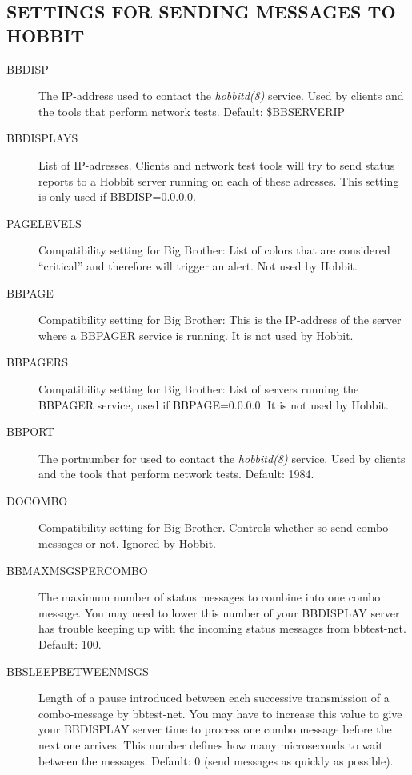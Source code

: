\subsection{SETTINGS FOR SENDING MESSAGES TO HOBBIT}
\begin{description}
\item[BBDISP] The IP-address used to contact the \emph{hobbitd(8)}
 service. Used by clients and the tools that perform network tests. Default: \$BBSERVERIP 

 

\item[BBDISPLAYS] List of IP-adresses. Clients and network test tools will try to send status reports to a Hobbit server running on each of these adresses. This setting is only used if BBDISP=0.0.0.0. 

 

\item[PAGELEVELS] Compatibility setting for Big Brother: List of colors that are considered ``critical'' and therefore will trigger an alert. Not used by Hobbit. 

 

\item[BBPAGE] Compatibility setting for Big Brother: This is the IP-address of the server where a BBPAGER service is running. It is not used by Hobbit. 

 

\item[BBPAGERS] Compatibility setting for Big Brother: List of servers running the BBPAGER service, used if BBPAGE=0.0.0.0. It is not used by Hobbit. 

 

\item[BBPORT] The portnumber for used to contact the \emph{hobbitd(8)}
 service. Used by clients and the tools that perform network tests. Default: 1984. 

 

\item[DOCOMBO] Compatibility setting for Big Brother. Controls whether so send combo-messages or not. Ignored by Hobbit. 

 

\item[BBMAXMSGSPERCOMBO] The maximum number of status messages to combine into one combo message. You may need to lower this number of your BBDISPLAY server has trouble keeping up with the incoming status messages from bbtest-net. Default: 100. 

 

\item[BBSLEEPBETWEENMSGS] Length of a pause introduced between each successive transmission of a combo-message by bbtest-net. You may have to increase this value to give your BBDISPLAY server time to process one combo message before the next one arrives. This number defines how many microseconds to wait between the messages. Default: 0 (send messages as quickly as possible). 

 


 


\end{description}
